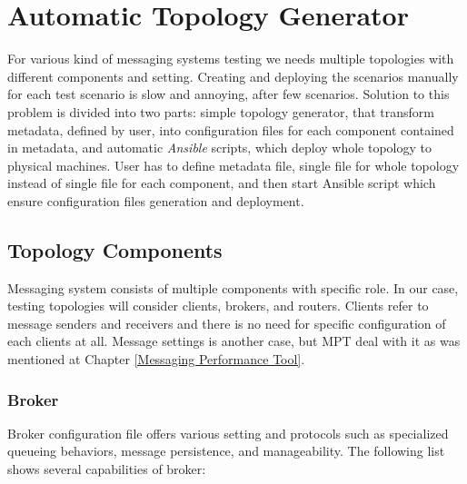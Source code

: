
\section{Automatic Topology Generator}
For various kind of messaging systems testing we needs multiple topologies with different components and setting. Creating and deploying the scenarios manually for each test scenario is slow and annoying, after few scenarios. Solution to this problem is divided into two parts: simple topology generator, that transform metadata, defined by user, into configuration files for each component contained in metadata, and automatic \emph{Ansible} scripts, which deploy whole topology to physical machines. User has to define metadata file, single file for whole topology instead of single file for each component, and then start Ansible script which ensure configuration files generation and deployment.


\subsection{Topology Components}
Messaging system consists of multiple components with specific role. In our case, testing topologies will consider clients, brokers, and routers. Clients refer to message senders and receivers and there is no need for specific configuration of each clients at all. Message settings is another case, but MPT deal with it as was mentioned at Chapter \ref{Messaging Performance Tool}.

\subsubsection*{Broker}
Broker configuration file offers various setting and protocols such as specialized queueing behaviors, message persistence, and manageability. The following list shows several capabilities of broker:

